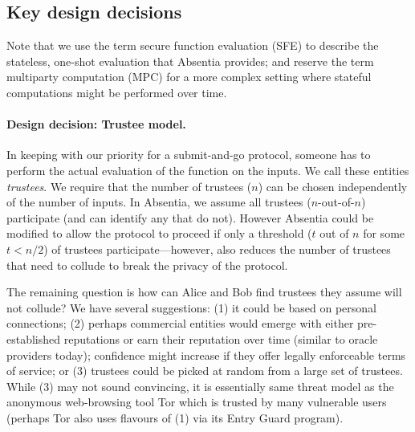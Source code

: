  
\subsection{Key design decisions}

Note that we use the term secure function evaluation (SFE) to describe the stateless, one-shot evaluation that Absentia provides; and reserve the term multiparty computation (MPC) for a more complex setting where stateful computations might be performed over time.

\paragraph{Design decision: Trustee model.} In keeping with our priority for a submit-and-go protocol, someone has to perform the actual evaluation of the function on the inputs. We call these entities \emph{trustees}. We require that the number of trustees ($n$) can be chosen independently of the number of inputs. In Absentia, we assume all trustees ($n$-out-of-$n$) participate (and can identify any that do not). However Absentia could be modified to allow the protocol to proceed if only a threshold ($t$ out of $n$ for some $t<n/2$) of trustees participate---however, also reduces the number of trustees that need to collude to break the privacy of the protocol.   

The remaining question is how can Alice and Bob find trustees they assume will not collude? We have several suggestions: (1) it could be based on personal connections; (2) perhaps commercial entities would emerge with either pre-established reputations or earn their reputation over time (similar to oracle providers today); confidence might increase if they offer legally enforceable terms of service; or (3) trustees could be picked at random from a large set of trustees. While (3) may not sound convincing, it is essentially same threat model as the anonymous web-browsing tool Tor which is trusted by many vulnerable users (perhaps Tor also uses flavours of (1) via its Entry Guard program). 

